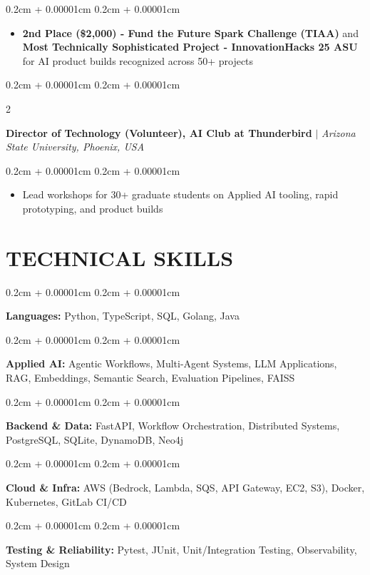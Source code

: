 \documentclass[9pt]{extarticle}
\newenvironment{highlights}{
    \begin{itemize}[
        topsep=0.02cm,
        parsep=0.02cm,
        partopsep=0pt,
        itemsep=0.01cm,
        leftmargin=0.4cm + 10pt
    ]
    \setlength{\itemsep}{0.01cm}
    \renewcommand{\labelitemi}{\textcolor{black}{$\bullet$}}
}{
    \end{itemize}
}
\newenvironment{onecolentry}{
    \begin{adjustwidth}{
        0.2cm + 0.00001cm
    }{
        0.2cm + 0.00001cm
    }
}{
    \end{adjustwidth}
}
\newenvironment{twocolentry}[2][]{
    \onecolentry
    \def\secondColumn{{\fontsize{8.5pt}{10pt}\selectfont #2}}
    \setcolumnwidth{\fill, 4cm}
    \begin{paracol}{2}
}{
    \switchcolumn \raggedleft \secondColumn
    \end{paracol}
    \endonecolentry
}
\begin{document}
    \begin{onecolentry}
        \begin{highlights}
            \item \textbf{2nd Place (\$2,000) - Fund the Future Spark Challenge (TIAA)} and \textbf{Most Technically Sophisticated Project - InnovationHacks 25 ASU} for AI product builds recognized across 50+ projects
        \end{highlights}
    \end{onecolentry}

    \vspace{0.06cm}

    \begin{twocolentry}{
    \textbf{November 2025 - Present}}
        \textbf{Director of Technology (Volunteer), AI Club at Thunderbird} $|$ \textit{Arizona State University, Phoenix, USA}
    \end{twocolentry}

    \vspace{0.05cm}

    \begin{onecolentry}
        \begin{highlights}
            \item Lead workshops for 30+ graduate students on Applied AI tooling, rapid prototyping, and product builds
        \end{highlights}
    \end{onecolentry}

    \section{TECHNICAL SKILLS}

    \begin{onecolentry}
        \textbf{Languages:} Python, TypeScript, SQL, Golang, Java
    \end{onecolentry}

    \begin{onecolentry}
        \textbf{Applied AI:} Agentic Workflows, Multi-Agent Systems, LLM Applications, RAG, Embeddings, Semantic Search, Evaluation Pipelines, FAISS
    \end{onecolentry}

    \begin{onecolentry}
        \textbf{Backend \& Data:} FastAPI, Workflow Orchestration, Distributed Systems, PostgreSQL, SQLite, DynamoDB, Neo4j
    \end{onecolentry}

    \begin{onecolentry}
        \textbf{Cloud \& Infra:} AWS (Bedrock, Lambda, SQS, API Gateway, EC2, S3), Docker, Kubernetes, GitLab CI/CD
    \end{onecolentry}

    \begin{onecolentry}
        \textbf{Testing \& Reliability:} Pytest, JUnit, Unit/Integration Testing, Observability, System Design
    \end{onecolentry}
\end{document}
